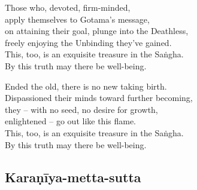 Those who, devoted, firm-minded,\\
apply themselves to Gotama's message,\\
on attaining their goal, plunge into the Deathless,\\
freely enjoying the Unbinding they've gained.\\
This, too, is an exquisite treasure in the Saṅgha.\\
By this truth may there be well-being.

Ended the old, there is no new taking birth.\\
Dispassioned their minds toward further becoming,\\
they -- with no seed, no desire for growth,\\
enlightened -- go out like this flame.\\
This, too, is an exquisite treasure in the Saṅgha.\\
By this truth may there be well-being.

\subsection{Karaṇīya-metta-sutta}
\label{karaniyam-attha}


